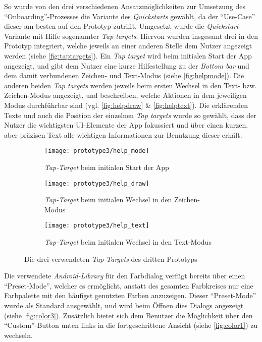 So wurde von den drei verschiedenen Ansatzmöglichkeiten zur Umsetzung des ``Onboarding''-Prozesses die Variante des \emph{Quickstarts} gewählt, da der ``Use-Case'' dieser am besten auf den Prototyp zutrifft.
Umgesetzt wurde die \emph{Quickstart} Variante mit Hilfe sogenannter \emph{Tap targets}.
Hiervon wurden insgesamt drei in den Prototyp integriert, welche jeweils an einer anderen Stelle dem Nutzer angezeigt werden (siehe \autoref{fig:taptargets}).
Ein \emph{Tap target} wird beim initialen Start der App angezeigt, und gibt dem Nutzer eine kurze Hilfestellung zu der \emph{Bottom bar} und dem damit verbundenen Zeichen- und Text-Modus (siehe \autoref{fig:helpmode}).
Die anderen beiden \emph{Tap targets} werden jeweils beim ersten Wechsel in den Text- bzw. Zeichen-Modus angezeigt, und beschreiben, welche Aktionen in dem jeweiligen Modus durchführbar sind (vgl. \autoref{fig:helpdraw} \& \autoref{fig:helptext}).
Die erklärenden Texte und auch die Position der einzelnen \emph{Tap targets} wurde so gewählt, dass der Nutzer die wichtigsten UI-Elemente der App fokussiert und über einen kurzen, aber präzisen Text alle wichtigen Informationen zur Benutzung dieser erhält. \\

\begin{figure}[h]
  \centering
  \begin{subfigure}[t]{0.3\textwidth}
    \texttt{[image: prototype3/help\_mode]}
    \caption{\emph{Tap-Target} beim initialen Start der App}
    \label{fig:helpmode}
  \end{subfigure}
  \begin{subfigure}[t]{0.3\textwidth}
    \texttt{[image: prototype3/help\_draw]}
    \caption{\emph{Tap-Target} beim initialen Wechsel in den Zeichen-Modus}
    \label{fig:helpdraw}
  \end{subfigure}
  \begin{subfigure}[t]{0.3\textwidth}
    \texttt{[image: prototype3/help\_text]}
    \caption{\emph{Tap-Target} beim initialen Wechsel in den Text-Modus}
    \label{fig:helptext}
  \end{subfigure}
  \caption{Die drei verwendeten \emph{Tap-Targets} des dritten Prototyps}
  \label{fig:taptargets}
\end{figure}

Die verwendete \emph{Android-Library} für den Farbdialog verfügt bereits über einen ``Preset-Mode'', welcher es ermöglicht, anstatt des gesamten Farbkreises nur eine Farbpalette mit den häufigst genutzten Farben anzuzeigen.
Dieser ``Preset-Mode'' wurde als Standard ausgewählt, und wird beim Öffnen dies Dialogs angezeigt (siehe \autoref{fig:color3}).
Zusätzlich bietet sich dem Benutzer die Möglichkeit über den ``Custom''-Button unten links in die fortgeschrittene Ansicht (siehe \autoref{fig:color1}) zu wechseln. \\

